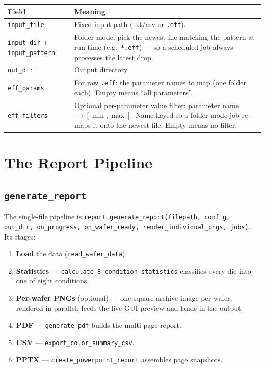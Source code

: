 \documentclass[11pt,a4paper]{report}
\newcommand{\code}[1]{\texttt{#1}}
\begin{document}
\begin{longtable}{@{}p{3.6cm}p{10.9cm}@{}}
\toprule
\textbf{Field} & \textbf{Meaning}\\
\midrule
\endhead
\code{input\_file} & Fixed input path (txt/csv or \code{.eff}).\\
\code{input\_dir} + \code{input\_pattern} & Folder mode: pick the newest file
  matching the pattern at run time (e.g.\ \code{*.eff}) — so a scheduled job
  always processes the latest drop.\\
\code{out\_dir} & Output directory.\\
\code{eff\_params} & For raw \code{.eff}: the parameter names to map (one folder
  each). Empty means ``all parameters''.\\
\code{eff\_filters} & Optional per-parameter value filter: parameter name
  $\to [\min, \max]$. Name-keyed so a folder-mode job re-maps it onto the newest
  file. Empty means no filter.\\
\bottomrule
\end{longtable}

\chapter{The Report Pipeline}\label{ch:pipeline}

\section{\code{generate\_report}}
The single-file pipeline is \code{report.generate\_report(filepath, config,
out\_dir, on\_progress, on\_wafer\_ready, render\_individual\_pngs, jobs)}. Its
stages:

\begin{enumerate}[leftmargin=1.6em]
  \item \textbf{Load} the data (\code{read\_wafer\_data}).
  \item \textbf{Statistics} — \code{calculate\_8\_condition\_statistics} classifies
        every die into one of eight conditions.
  \item \textbf{Per-wafer PNGs} (optional) — one square archive image per wafer,
        rendered in parallel; feeds the live GUI preview and lands in the output.
  \item \textbf{PDF} — \code{generate\_pdf} builds the multi-page report.
  \item \textbf{CSV} — \code{export\_color\_summary\_csv}.
  \item \textbf{PPTX} — \code{create\_powerpoint\_report} assembles page snapshots.
\end{enumerate}
\end{document}
